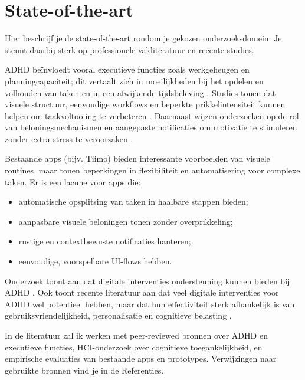 \section{State-of-the-art}
\label{sec:literatuurstudie}

Hier beschrijf je de state-of-the-art rondom je gekozen onderzoeksdomein. Je steunt daarbij sterk op professionele vakliteratuur en recente studies.

ADHD beïnvloedt vooral executieve functies zoals werkgeheugen en planningcapaciteit; dit vertaalt zich in moeilijkheden bij het opdelen en volhouden van taken en in een afwijkende tijdsbeleving \parencite{Alloway2010}. Studies tonen dat visuele structuur, eenvoudige workflows en beperkte prikkelintensiteit kunnen helpen om taakvoltooiing te verbeteren \parencite{Visser2016, Seeman2022}. Daarnaast wijzen onderzoeken op de rol van beloningsmechanismen en aangepaste notificaties om motivatie te stimuleren zonder extra stress te veroorzaken \parencite{Gamification2021}.

Bestaande apps (bijv. Tiimo) bieden interessante voorbeelden van visuele routines, maar tonen beperkingen in flexibiliteit en automatisering voor complexe taken. Er is een lacune voor apps die:
\begin{itemize}
  \item automatische opsplitsing van taken in haalbare stappen bieden;
  \item aanpasbare visuele beloningen tonen zonder overprikkeling;
  \item rustige en contextbewuste notificaties hanteren;
  \item eenvoudige, voorspelbare UI-flows hebben.
\end{itemize}
Onderzoek toont aan dat digitale interventies ondersteuning kunnen bieden bij ADHD \parencite{cortese2023adhd}. Ook toont recente literatuur aan dat veel digitale interventies voor ADHD wel potentieel hebben, maar dat hun effectiviteit sterk afhankelijk is van gebruiksvriendelijkheid, personalisatie en cognitieve belasting \parencite{bmc2025digitaladhd}.

In de literatuur zal ik werken met peer-reviewed bronnen over ADHD en executieve functies, HCI-onderzoek over cognitieve toegankelijkheid, en empirische evaluaties van bestaande apps en prototypes. Verwijzingen naar gebruikte bronnen vind je in de Referenties.

